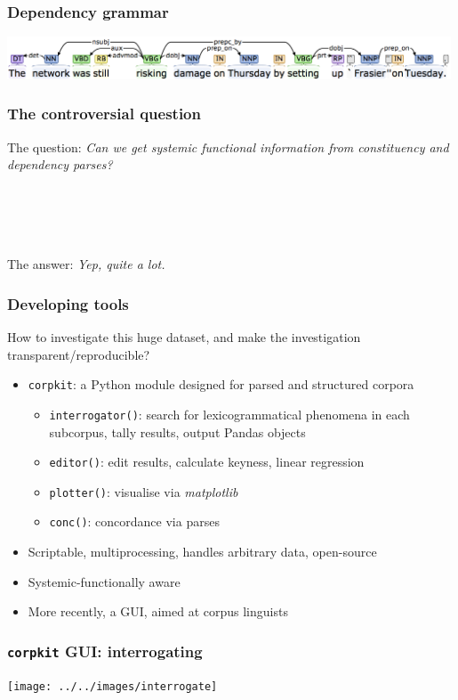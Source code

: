 \documentclass{beamer}       %
\begin{document}
\begin{frame}
    \frametitle{Dependency grammar}
    \centering
    \includegraphics[width=0.99\textwidth]{../../images/depparse}
\end{frame}

\begin{frame}\frametitle{The controversial question}

The question: \emph{Can we get systemic functional information from constituency and dependency parses?}

~\\~\\~\\~\\

The answer: \emph{Yep, quite a lot.}
\end{frame}

\begin{frame}\frametitle{Developing tools}
How to investigate this huge dataset, and make the investigation transparent\slash reproducible?

\begin{itemize}
    \item \texttt{corpkit}: a Python module designed for parsed and structured corpora
    \begin{itemize}
        \item \texttt{interrogator()}: search for lexicogrammatical phenomena in each subcorpus, tally results, output Pandas objects
        \item \texttt{editor()}: edit results, calculate keyness, linear regression 
        \item \texttt{plotter()}: visualise via \emph{matplotlib} 
        \item \texttt{conc()}: concordance via parses 
    \end{itemize}
    \item Scriptable, multiprocessing, handles arbitrary data, open-source
    \item Systemic-functionally aware
    \item More recently, a GUI, aimed at corpus linguists
\end{itemize}
\end{frame}

\begin{frame}
    \frametitle{\texttt{corpkit} GUI: interrogating}
    \centering
    \texttt{[image: ../../images/interrogate]}
\end{frame}
\end{document}
